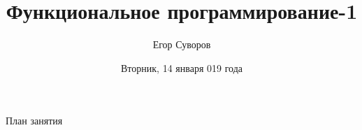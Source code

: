 \documentclass[utf8,xcolor=table]{beamer}
\title[ФП-1]{Функциональное программирование-1}
\author{Егор Суворов}
\institute[НИУ ВШЭ]{Курс <<Основы программирования>>}
\date[14.01.2020]{Вторник, 14 января 019 года}
\begin{document}
\begin{frame}
\titlepage
\end{frame}

\begin{frame}{План занятия}
	\tableofcontents
\end{frame}













\end{document}
